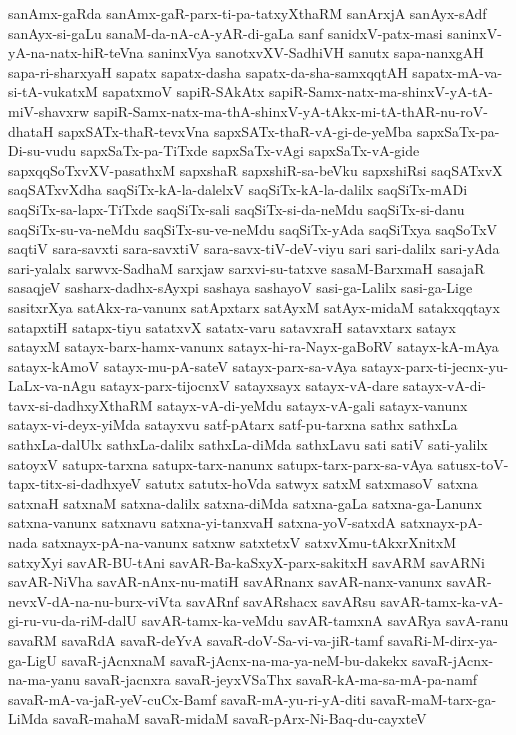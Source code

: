 {sanAmx-gaRda
sanAmx-gaR-parx-ti-pa-tatxyXthaRM
sanArxjA
sanAyx-sAdf
sanAyx-si-gaLu
sanaM-da-nA-cA-yAR-di-gaLa
sanf
sanidxV-patx-masi
saninxV-yA-na-natx-hiR-teVna
saninxVya
sanotxvXV-SadhiVH
sanutx
sapa-nanxgAH
sapa-ri-sharxyaH
sapatx
sapatx-dasha
sapatx-da-sha-samxqqtAH
sapatx-mA-va-si-tA-vukatxM
sapatxmoV
sapiR-SAkAtx
sapiR-Samx-natx-ma-shinxV-yA-tA-miV-shavxrw
sapiR-Samx-natx-ma-thA-shinxV-yA-tAkx-mi-tA-thAR-nu-roV-dhataH
sapxSATx-thaR-tevxVna
sapxSATx-thaR-vA-gi-de-yeMba
sapxSaTx-pa-Di-su-vudu
sapxSaTx-pa-TiTxde
sapxSaTx-vAgi
sapxSaTx-vA-gide
sapxqqSoTxvXV-pasathxM
sapxshaR
sapxshiR-sa-beVku
sapxshiRsi
saqSATxvX
saqSATxvXdha
saqSiTx-kA-la-dalelxV
saqSiTx-kA-la-dalilx
saqSiTx-mADi
saqSiTx-sa-lapx-TiTxde
saqSiTx-sali
saqSiTx-si-da-neMdu
saqSiTx-si-danu
saqSiTx-su-va-neMdu
saqSiTx-su-ve-neMdu
saqSiTx-yAda
saqSiTxya
saqSoTxV
saqtiV
sara-savxti
sara-savxtiV
sara-savx-tiV-deV-viyu
sari
sari-dalilx
sari-yAda
sari-yalalx
sarwvx-SadhaM
sarxjaw
sarxvi-su-tatxve
sasaM-BarxmaH
sasajaR
sasaqjeV
sasharx-dadhx-sAyxpi
sashaya
sashayoV
sasi-ga-Lalilx
sasi-ga-Lige
sasitxrXya
satAkx-ra-vanunx
satApxtarx
satAyxM
satAyx-midaM
satakxqqtayx
satapxtiH
satapx-tiyu
satatxvX
satatx-varu
satavxraH
satavxtarx
satayx
satayxM
satayx-barx-hamx-vanunx
satayx-hi-ra-Nayx-gaBoRV
satayx-kA-mAya
satayx-kAmoV
satayx-mu-pA-sateV
satayx-parx-sa-vAya
satayx-parx-ti-jecnx-yu-LaLx-va-nAgu
satayx-parx-tijocnxV
satayxsayx
satayx-vA-dare
satayx-vA-di-tavx-si-dadhxyXthaRM
satayx-vA-di-yeMdu
satayx-vA-gali
satayx-vanunx
satayx-vi-deyx-yiMda
satayxvu
satf-pAtarx
satf-pu-tarxna
sathx
sathxLa
sathxLa-dalUlx
sathxLa-dalilx
sathxLa-diMda
sathxLavu
sati
satiV
sati-yalilx
satoyxV
satupx-tarxna
satupx-tarx-nanunx
satupx-tarx-parx-sa-vAya
satusx-toV-tapx-titx-si-dadhxyeV
satutx
satutx-hoVda
satwyx
satxM
satxmasoV
satxna
satxnaH
satxnaM
satxna-dalilx
satxna-diMda
satxna-gaLa
satxna-ga-Lanunx
satxna-vanunx
satxnavu
satxna-yi-tanxvaH
satxna-yoV-satxdA
satxnayx-pA-nada
satxnayx-pA-na-vanunx
satxnw
satxtetxV
satxvXmu-tAkxrXnitxM
satxyXyi
savAR-BU-tAni
savAR-Ba-kaSxyX-parx-sakitxH
savARM
savARNi
savAR-NiVha
savAR-nAnx-nu-matiH
savARnanx
savAR-nanx-vanunx
savAR-nevxV-dA-na-nu-burx-viVta
savARnf
savARshacx
savARsu
savAR-tamx-ka-vA-gi-ru-vu-da-riM-dalU
savAR-tamx-ka-veMdu
savAR-tamxnA
savARya
savA-ranu
savaRM
savaRdA
savaR-deYvA
savaR-doV-Sa-vi-va-jiR-tamf
savaRi-M-dirx-ya-ga-LigU
savaR-jAcnxnaM
savaR-jAcnx-na-ma-ya-neM-bu-dakekx
savaR-jAcnx-na-ma-yanu
savaR-jacnxra
savaR-jeyxVSaThx
savaR-kA-ma-sa-mA-pa-namf
savaR-mA-va-jaR-yeV-cuCx-Bamf
savaR-mA-yu-ri-yA-diti
savaR-maM-tarx-ga-LiMda
savaR-mahaM
savaR-midaM
savaR-pArx-Ni-Baq-du-cayxteV
}

